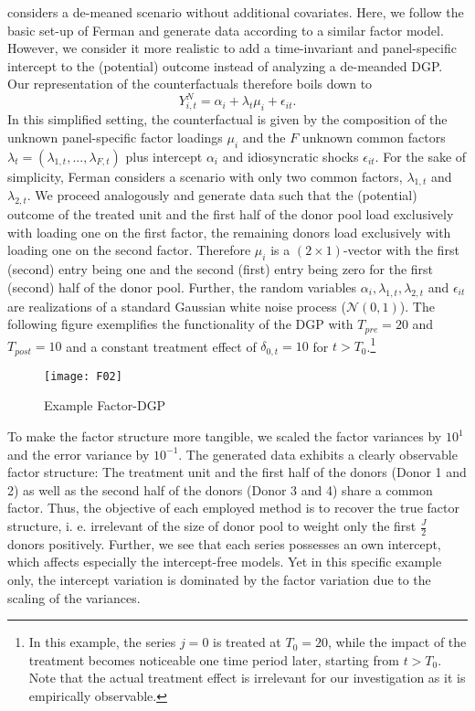 \cite{ferman:2021} considers a de-meaned scenario without additional covariates. Here, we follow the basic set-up of Ferman and generate data according to a similar factor model. However, we consider it more realistic to add a time-invariant and panel-specific intercept to the (potential) outcome instead of analyzing a de-meanded \ac{DGP}. Our representation of the counterfactuals therefore boils down to 
\begin{equation*}
	Y_{i,t}^{N} = \alpha_i + \lambda_t \mu_i + \epsilon_{it}.
\end{equation*}
In this simplified setting, the counterfactual is given by the composition of the unknown panel-specific factor loadings $\mu_i$ and the $F$ unknown common factors $\lambda_t = (\lambda_{1,t}, ..., \lambda_{F,t})$ plus intercept $\alpha_i$ and idiosyncratic shocks $\epsilon_{it}$. For the sake of simplicity, Ferman considers a scenario with only two common factors, $\lambda_{1,t}$ and $\lambda_{2,t}$. We proceed analogously and generate data such that the (potential) outcome of the treated unit and the first half of the donor pool load exclusively with loading one on the first factor, the remaining donors load exclusively with loading one on the second factor. Therefore $\mu_i$ is a $(2 \times 1)$-vector with the first (second) entry being one and the second (first) entry being zero for the first (second) half of the donor pool. Further, the random variables $\alpha_i, \lambda_{1,t}, \lambda_{2,t}$ and $\epsilon_{it}$ are realizations of a standard Gaussian white noise process ($\mathcal{N}(0,1)$). The following figure exemplifies the functionality of the \ac{DGP} with $T_{pre} = 20$ and $T_{post} = 10$ and a constant treatment effect of $\delta_{0,t} = 10$ for $t > T_0$.\footnote{In this example, the series $j = 0$ is treated at $T_0 = 20$, while the impact of the treatment becomes noticeable one time period later, starting from $t > T_0$. Note that the actual treatment effect is irrelevant for our investigation as it is empirically observable.}  
\begin{figure}[H]
	\centering
	\texttt{[image: F02]}
	\caption{Example Factor-\ac{DGP}}
	\label{F_02}
\end{figure}
To make the factor structure more tangible, we scaled the factor variances by $10^1$ and the error variance by $10^{-1}$. The generated data exhibits a clearly observable factor structure: The treatment unit and the first half of the donors (Donor 1 and 2) as well as the second half of the donors (Donor 3 and 4) share a common factor. Thus, the objective of each employed method is to recover the true factor structure, i. e. irrelevant of the size of donor pool to weight only the first $\frac{J}{2}$ donors positively. Further, we see that each series possesses an own intercept, which affects especially the intercept-free models. Yet in this specific example only, the intercept variation is dominated by the factor variation due to the scaling of the variances.

